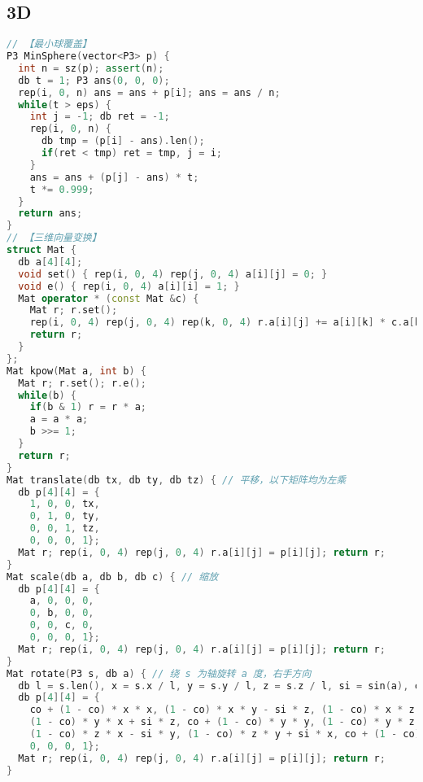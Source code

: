 \subsection{3D}
\begin{lstlisting}[language=C++]
// 【最小球覆盖】
P3 MinSphere(vector<P3> p) {
  int n = sz(p); assert(n);
  db t = 1; P3 ans(0, 0, 0);
  rep(i, 0, n) ans = ans + p[i]; ans = ans / n;
  while(t > eps) {
    int j = -1; db ret = -1;
    rep(i, 0, n) {
      db tmp = (p[i] - ans).len();
      if(ret < tmp) ret = tmp, j = i;
    }
    ans = ans + (p[j] - ans) * t;
    t *= 0.999;
  }
  return ans;
}
// 【三维向量变换】
struct Mat {
  db a[4][4];
  void set() { rep(i, 0, 4) rep(j, 0, 4) a[i][j] = 0; }
  void e() { rep(i, 0, 4) a[i][i] = 1; }
  Mat operator * (const Mat &c) {
    Mat r; r.set();
    rep(i, 0, 4) rep(j, 0, 4) rep(k, 0, 4) r.a[i][j] += a[i][k] * c.a[k][j];
    return r;
  }
};
Mat kpow(Mat a, int b) {
  Mat r; r.set(); r.e();
  while(b) {
    if(b & 1) r = r * a;
    a = a * a;
    b >>= 1;
  }
  return r;
}
Mat translate(db tx, db ty, db tz) { // 平移，以下矩阵均为左乘
  db p[4][4] = {
    1, 0, 0, tx, 
    0, 1, 0, ty,
    0, 0, 1, tz,
    0, 0, 0, 1};
  Mat r; rep(i, 0, 4) rep(j, 0, 4) r.a[i][j] = p[i][j]; return r;
}
Mat scale(db a, db b, db c) { // 缩放
  db p[4][4] = {
    a, 0, 0, 0,
    0, b, 0, 0,
    0, 0, c, 0,
    0, 0, 0, 1};
  Mat r; rep(i, 0, 4) rep(j, 0, 4) r.a[i][j] = p[i][j]; return r;
}
Mat rotate(P3 s, db a) { // 绕 s 为轴旋转 a 度，右手方向
  db l = s.len(), x = s.x / l, y = s.y / l, z = s.z / l, si = sin(a), co = cos(a);
  db p[4][4] = {
    co + (1 - co) * x * x, (1 - co) * x * y - si * z, (1 - co) * x * z + si * y, 0,
    (1 - co) * y * x + si * z, co + (1 - co) * y * y, (1 - co) * y * z - si * x, 0,
    (1 - co) * z * x - si * y, (1 - co) * z * y + si * x, co + (1 - co) * z * z, 0,
    0, 0, 0, 1};
  Mat r; rep(i, 0, 4) rep(j, 0, 4) r.a[i][j] = p[i][j]; return r;
}
\end{lstlisting}
